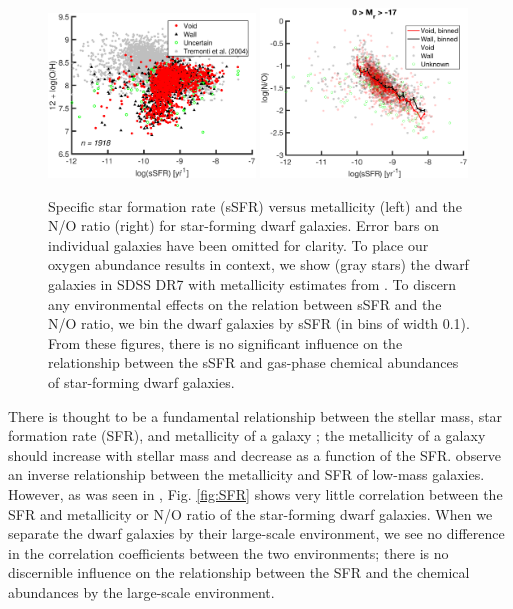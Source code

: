 \begin{figure}
    \centering
    \includegraphics[width=0.49\textwidth]{Images/Paper3/sSFR_OH_1sig_I06relations_dwarf+T04_SF_t3_dust}
    \includegraphics[width=0.49\textwidth]{Images/Paper3/sSFR_NO_1sig_I06relations_dwarf_SF_t3_dust_scattersSFRbin}
    \caption[sSFR versus O/H and N/O for star-forming dwarf galaxies]{Specific 
    star formation rate (sSFR) versus metallicity (left) and the N/O ratio 
    (right) for star-forming dwarf galaxies.  Error bars on individual galaxies 
    have been omitted for clarity.  To place our oxygen abundance results in 
    context, we show (gray stars) the dwarf galaxies in SDSS DR7 with 
    metallicity estimates from \cite{Tremonti04}.  To discern any environmental 
    effects on the relation between sSFR and the N/O ratio, we bin the dwarf 
    galaxies by sSFR (in bins of width 0.1).  From these figures, there is no 
    significant influence on the relationship between the sSFR and gas-phase 
    chemical abundances of star-forming dwarf galaxies.}
    \label{fig:sSFR_P3}
\end{figure}

There is thought to be a fundamental relationship between the stellar mass, star 
formation rate (SFR), and metallicity of a galaxy \citep{Mannucci10,LaraLopez10,
Andrews13}; the metallicity of a galaxy should increase with stellar mass and 
decrease as a function of the SFR.  \cite{Henry13} observe an inverse 
relationship between the metallicity and SFR of low-mass galaxies.  However, as 
was seen in \cite{Douglass17a}, Fig. \ref{fig:SFR} shows very little correlation 
between the SFR and metallicity or N/O ratio of the star-forming dwarf galaxies.  
When we separate the dwarf galaxies by their large-scale environment, we see no 
difference in the correlation coefficients between the two environments; there 
is no discernible influence on the relationship between the SFR and the chemical 
abundances by the large-scale environment.

